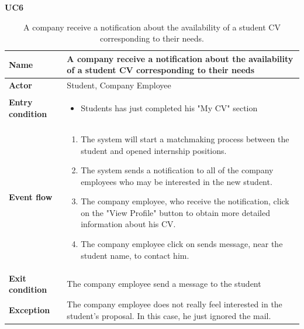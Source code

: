     \textbf{UC6}
    \nopagebreak
    \begin{table}[H]
        \centering
        \begin{tabular}{|l|p{11.9cm}|}
        \hline
        \textbf{Name}            & A company receive a notification about the availability of a student CV corresponding to their needs \\\hline
        \textbf{Actor}           & Student, Company Employee       \\\hline
        \textbf{Entry condition} &
        \begin{itemize}
              \item Students has just completed his "My CV" section
        \end{itemize}                                        \\\hline
        \textbf{Event flow}      &
        \begin{enumerate}[label=\arabic*.]
              \item The system will start a matchmaking process between the student and opened internship positions.
              \item The system sends a notification to all of the company employees who may be interested in the new student.
              \item The company employee, who receive the notification, click on the "View Profile" button to obtain more detailed information about his CV.
              \item The company employee click on sends message, near the student name, to contact him.
              
        \end{enumerate}            \\\hline
        \textbf{Exit condition}  & The company employee send a message to the student  \\\hline
        \textbf{Exception}       &  The company employee does not really feel interested in the student's proposal. In this case, he just ignored the mail.   \\\hline
        \end{tabular}
        \caption{A company receive a notification about the availability of a student CV corresponding to their needs.}
        \label{table:A company receive a notification about the availability of a student CV corresponding to their needs}
    \end{table}

